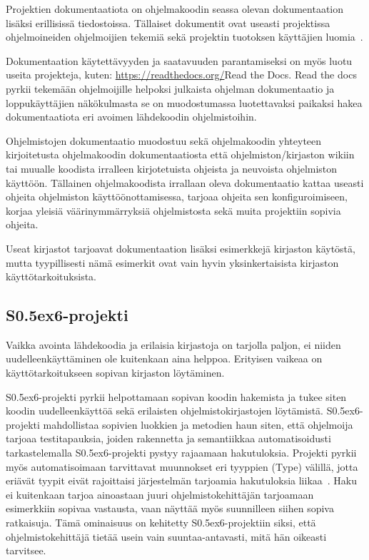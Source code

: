 \documentclass[finnish]{tktltiki2}
\theoremstyle{definition}
\theoremstyle{remark}
\begin{document}
Projektien dokumentaatiota on ohjelmakoodin seassa olevan dokumentaation lisäksi erillisissä tiedostoissa. Tällaiset dokumentit ovat useasti  projektissa ohjelmoineiden ohjelmoijien tekemiä sekä projektin tuotoksen käyttäjien luomia~\cite{using-wikis-in-sw}.

Dokumentaation käytettävyyden ja saatavuuden parantamiseksi on myös luotu useita projekteja, kuten: \url{https://readthedocs.org/}{Read the Docs}. Read the docs pyrkii tekemään ohjelmoijille helpoksi julkaista ohjelman dokumentaatio ja loppukäyttäjien näkökulmasta se on muodostumassa luotettavaksi paikaksi hakea dokumentaatiota eri avoimen lähdekoodin ohjelmistoihin.

Ohjelmistojen dokumentaatio muodostuu sekä ohjelmakoodin yhteyteen kirjoitetusta ohjelmakoodin dokumentaatiosta että ohjelmiston/kirjaston wikiin~\cite{using-wikis-in-sw} tai muualle koodista irralleen kirjotetuista ohjeista ja neuvoista ohjelmiston käyttöön.
Tällainen ohjelmakoodista irrallaan oleva dokumentaatio kattaa useasti ohjeita ohjelmiston käyttöönottamisessa, tarjoaa ohjeita sen konfiguroimiseen, korjaa yleisiä väärinymmärryksiä ohjelmistosta sekä muita projektiin sopivia ohjeita.

Useat kirjastot tarjoavat dokumentaation lisäksi esimerkkejä kirjaston käytöstä, mutta tyypillisesti nämä esimerkit ovat vain hyvin yksinkertaisista kirjaston käyttötarkoituksista.

\subsection{S\raise0.5ex\hbox{6}-projekti}
Vaikka avointa lähdekoodia ja erilaisia kirjastoja on tarjolla paljon, ei niiden uudelleenkäyttäminen ole kuitenkaan aina helppoa. Erityisen vaikeaa on käyttötarkoitukseen sopivan kirjaston löytäminen.

S\raise0.5ex\hbox{6}-projekti pyrkii helpottamaan sopivan koodin hakemista ja tukee siten koodin uudelleenkäyttöä sekä erilaisten ohjelmistokirjastojen löytämistä. S\raise0.5ex\hbox{6}-projekti mahdollistaa sopivien luokkien ja metodien haun siten, että ohjelmoija tarjoaa testitapauksia, joiden rakennetta ja semantiikkaa automatisoidusti tarkastelemalla S\raise0.5ex\hbox{6}-projekti pystyy rajaamaan hakutuloksia. Projekti pyrkii myös automatisoimaan tarvittavat muunnokset eri tyyppien (Type) välillä, jotta eriävät tyypit eivät rajoittaisi järjestelmän tarjoamia hakutuloksia liikaa~\cite{what-to-search-for}. Haku ei kuitenkaan tarjoa ainoastaan juuri ohjelmistokehittäjän tarjoamaan esimerkkiin sopivaa vastausta, vaan näyttää myös suunnilleen siihen sopiva ratkaisuja. Tämä ominaisuus on kehitetty S\raise0.5ex\hbox{6}-projektiin siksi, että ohjelmistokehittäjä tietää usein vain suuntaa-antavasti, mitä hän oikeasti tarvitsee.
\end{document}
